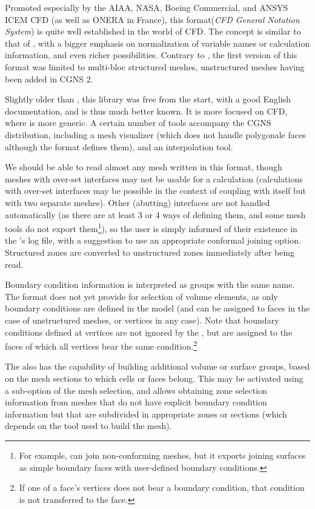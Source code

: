 {{{
\label{sec:fmtdesc_cgns}

Promoted especially by the AIAA, NASA, Boeing Commercial, and ANSYS ICEM CFD (as well as ONERA in France),
this format(\emph{CFD General Notation System}) is quite well established in
the world of CFD. The concept is similar to that of \med, with a bigger
emphasis on normalization of variable names or calculation information, and
even richer possibilities. Contrary to \med, the first version of this format
was limited to multi-bloc structured meshes, unstructured meshes having been
added in CGNS 2.

Slightly older than \med, this library was free from the start, with a good
English documentation, and is thus much better known. It is more focused
on CFD, where \med is more generic. A certain number of tools accompany
the CGNS distribution, including a mesh visualizer (which does not handle
polygonale faces although the format defines them), and an interpolation
tool.

We should be able to read almost any mesh written in this format, though
meshes with over-set interfaces may not be usable for a calculation
(calculations with over-set interfaces may be possible in the context of coupling \CS
with itself but with two separate meshes).
Other (abutting) interfaces are not handled automatically (as there are
at least 3 or 4 ways of defining them, and some mesh tools do not export
them\footnote{For example, \icemcfd can join non-conforming meshes, but it
exports joining surfaces as simple boundary faces with user-defined boundary
conditions.}), so the user is simply informed of their existence in the
\pcs's log file, with a suggestion to use an appropriate conformal joining
option. Structured zones are converted to unstructured zones immediately after
being read.

Boundary condition information is interpreted as groups with the same
name. The format does not yet provide for selection of volume elements,
as only boundary conditions are defined in the model (and can be assigned to
faces in the case of unstructured meshes, or vertices in any case).
Note that boundary conditions defined at vertices are not ignored by
the \pcs, but are assigned to the faces of which all vertices bear
the same condition.\footnote{If one of a face's vertices does not bear
a boundary condition, that condition is not transferred to the face.}

The \pcs also has the capability of building additional volume or surface groups,
based on the mesh sections to which cells or faces belong. This may be
activated using a sub-option of the mesh selection, and allows obtaining
zone selection information from meshes that do not have explicit
boundary condition information but that are subdivided in appropriate zones or
sections (which depends on the tool used to build the mesh).

}}}

